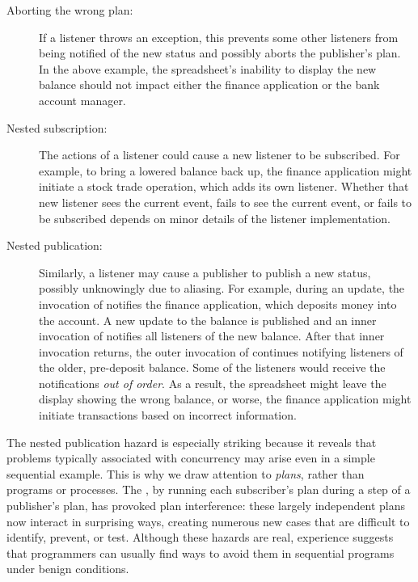 \documentclass{llncs}
\begin{document}
\begin{description}

\item[Aborting the wrong plan:] 

If a listener throws an exception, this prevents some other listeners
from being notified of the new status and possibly aborts the
publisher's plan. In the above example, the spreadsheet's inability to
display the new balance should not impact either the finance
application or the bank account manager.

\item[Nested subscription:] 

The actions of a listener could cause a new listener to be subscribed.
For example, to bring a lowered balance back up, the finance
application might initiate a stock trade operation, which adds its own
listener.  Whether that new listener sees the current event, fails to
see the current event, or fails to be subscribed depends on minor
details of the listener implementation.

\item[Nested publication:] 

Similarly, a listener may cause a publisher to publish a new status,
possibly unknowingly due to aliasing.  For example, during an update,
the invocation of  notifies the finance application,
which deposits money into the account. A new update to the balance is
published and an inner invocation of  notifies all
listeners of the new balance.  After that inner invocation returns,
the outer invocation of  continues notifying listeners
of the older, pre-deposit balance.  Some of the listeners would
receive the notifications \emph{out of order}.  As a result, the
spreadsheet might leave the display showing the wrong balance, or
worse, the finance application might initiate transactions based on
incorrect information.

\end{description}
%
The nested publication hazard is especially striking because it
reveals that problems typically associated with concurrency may arise
even in a simple sequential example. This is why we draw attention to
\emph{plans}, rather than programs or processes. The
, by running each subscriber's plan during a step
of a publisher's plan, has provoked plan interference: these largely
independent plans now interact in surprising ways, creating numerous
new cases that are difficult to identify, prevent, or test. Although
these hazards are real, experience suggests that programmers can
usually find ways to avoid them in sequential programs under benign
conditions.
\end{document}
